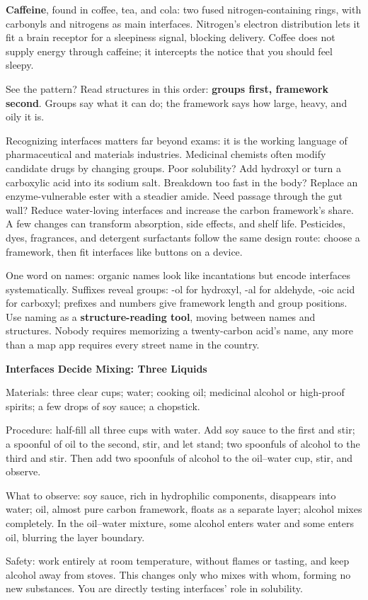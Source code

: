 \textbf{Caffeine}, found in coffee, tea, and cola: two fused nitrogen-containing rings, with carbonyls and nitrogens as main interfaces. Nitrogen's electron distribution lets it fit a brain receptor for a sleepiness signal, blocking delivery. Coffee does not supply energy through caffeine; it intercepts the notice that you should feel sleepy.

See the pattern? Read structures in this order: \textbf{groups first, framework second}. Groups say what it can do; the framework says how large, heavy, and oily it is.

Recognizing interfaces matters far beyond exams: it is the working language of pharmaceutical and materials industries. Medicinal chemists often modify candidate drugs by changing groups. Poor solubility? Add hydroxyl or turn a carboxylic acid into its sodium salt. Breakdown too fast in the body? Replace an enzyme-vulnerable ester with a steadier amide. Need passage through the gut wall? Reduce water-loving interfaces and increase the carbon framework's share. A few changes can transform absorption, side effects, and shelf life. Pesticides, dyes, fragrances, and detergent surfactants follow the same design route: choose a framework, then fit interfaces like buttons on a device.

One word on names: organic names look like incantations but encode interfaces systematically. Suffixes reveal groups: -ol for hydroxyl, -al for aldehyde, -oic acid for carboxyl; prefixes and numbers give framework length and group positions. Use naming as a \textbf{structure-reading tool}, moving between names and structures. Nobody requires memorizing a twenty-carbon acid's name, any more than a map app requires every street name in the country.

\begin{shiyan}
\textbf{Interfaces Decide Mixing: Three Liquids}

Materials: three clear cups; water; cooking oil; medicinal alcohol or high-proof spirits; a few drops of soy sauce; a chopstick.

Procedure: half-fill all three cups with water. Add soy sauce to the first and stir; a spoonful of oil to the second, stir, and let stand; two spoonfuls of alcohol to the third and stir. Then add two spoonfuls of alcohol to the oil--water cup, stir, and observe.

What to observe: soy sauce, rich in hydrophilic components, disappears into water; oil, almost pure carbon framework, floats as a separate layer; alcohol mixes completely. In the oil--water mixture, some alcohol enters water and some enters oil, blurring the layer boundary.

Safety: work entirely at room temperature, without flames or tasting, and keep alcohol away from stoves. This changes only who mixes with whom, forming no new substances. You are directly testing interfaces' role in solubility.
\end{shiyan}

